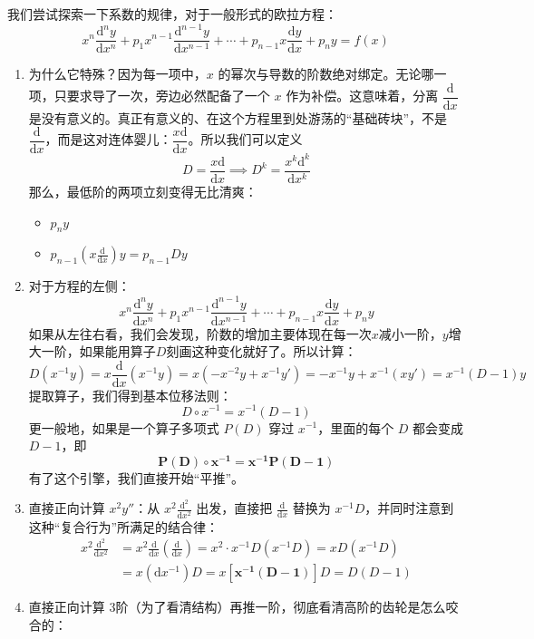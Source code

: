 \documentclass[lang=cn,11pt]{elegantbook}
\begin{document}
\begin{remark}[变换的本质]
我们尝试探索一下系数的规律，对于一般形式的欧拉方程：
\[
x^n \frac{\mathrm{d}^ny}{\mathrm{d}x^n} + p_1 x^{n-1} \frac{\mathrm{d}^{n-1}y}{\mathrm{d}x^{n-1}} + \cdots + p_{n-1} x \frac{\mathrm{d}y}{\mathrm{d}x} + p_n y = f(x)
\]
\begin{enumerate}
    \item 为什么它特殊？因为每一项中，$x$ 的幂次与导数的阶数绝对绑定。无论哪一项，只要求导了一次，旁边必然配备了一个 $x$ 作为补偿。这意味着，分离 $\dfrac{\mathrm{d}}{\mathrm{d}x}$ 是没有意义的。真正有意义的、在这个方程里到处游荡的“基础砖块”，不是 $\dfrac{\mathrm{d}}{\mathrm{d}x}$，而是这对连体婴儿：$\dfrac{x\mathrm{d}}{\mathrm{d}x}$。所以我们可以定义
\[D=\dfrac{x\mathrm{d}}{\mathrm{d}x}\implies D^k=\frac{x^k\mathrm{d}^k}{\mathrm{d}x^k}\]
那么，最低阶的两项立刻变得无比清爽：
\begin{itemize}
\item $p_n y$
\item $p_{n-1} \left(x\frac{\mathrm{d}}{\mathrm{d}x}\right)y = p_{n-1} D y$
\end{itemize}
\item 对于方程的左侧：
\[x^n \frac{\mathrm{d}^ny}{\mathrm{d}x^n} + p_1 x^{n-1} \frac{\mathrm{d}^{n-1}y}{\mathrm{d}x^{n-1}} + \cdots + p_{n-1} x \frac{\mathrm{d}y}{\mathrm{d}x} + p_n y\]
如果从左往右看，我们会发现，阶数的增加主要体现在每一次$x$减小一阶，$y$增大一阶，如果能用算子$D$刻画这种变化就好了。所以计算：
\[
D(x^{-1}y) = x\frac{\mathrm{d}}{\mathrm{d}x}(x^{-1}y) = x(-x^{-2}y + x^{-1}y') = -x^{-1}y + x^{-1}(xy') = x^{-1}(D-1)y
\]
提取算子，我们得到基本位移法则：
\[
\boxed{D \circ x^{-1} = x^{-1}(D-1)}
\]
更一般地，如果是一个算子多项式 $P(D)$ 穿过 $x^{-1}$，里面的每个 $D$ 都会变成 $D-1$，即 \[\mathbf{P(D) \circ x^{-1} = x^{-1}P(D-1)}\]
有了这个引擎，我们直接开始“平推”。
\item 直接正向计算 $x^2 y''$：从 $x^2 \frac{\mathrm{d}^2}{\mathrm{d}x^2}$ 出发，直接把 $\frac{\mathrm{d}}{\mathrm{d}x}$ 替换为 $x^{-1}D$，并同时注意到这种“复合行为”所满足的结合律：
\begin{align*}
x^2 \frac{\mathrm{d}^2}{\mathrm{d}x^2} &=x^2\frac{\mathrm{d}}{\mathrm{d}x}\left(\frac{\mathrm{d}}{\mathrm{d}x}\right)= x^2\cdot x^{-1}D\left(x^{-1}D\right)=xD\left(x^{-1}D\right)\\
&=x (\mathrm{d}x^{-1})D=x \left[ \mathbf{x^{-1}(D-1)} \right] D=D(D-1)
\end{align*}
\item 直接正向计算 3阶（为了看清结构）再推一阶，彻底看清高阶的齿轮是怎么咬合的：

\end{enumerate}
\end{remark}
\end{document}
